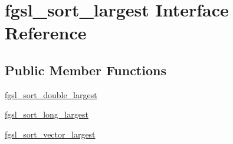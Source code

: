 \hypertarget{interfacefgsl__sort__largest}{\section{fgsl\-\_\-sort\-\_\-largest Interface Reference}
\label{interfacefgsl__sort__largest}
}
\subsection*{Public Member Functions}
\begin{DoxyCompactItemize}
\item 
\hyperlink{interfacefgsl__sort__largest_acdeefd3309718051ae27f8e290b43f74}{fgsl\-\_\-sort\-\_\-double\-\_\-largest}
\item 
\hyperlink{interfacefgsl__sort__largest_a0dd8552a6d0bedcddf36b31be56e1075}{fgsl\-\_\-sort\-\_\-long\-\_\-largest}
\item 
\hyperlink{interfacefgsl__sort__largest_a4149cae50500783202c97aa4b33583b7}{fgsl\-\_\-sort\-\_\-vector\-\_\-largest}
\end{DoxyCompactItemize}


